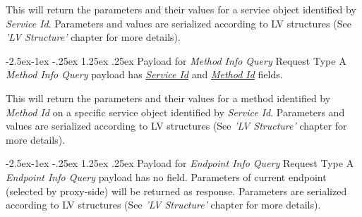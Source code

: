 \documentclass[10pt,a4paper]{article}
\makeatletter
\renewcommand\paragraph{\@startsection{paragraph}{4}{\z@}%
            {-2.5ex\@plus -1ex \@minus -.25ex}%
            {1.25ex \@plus .25ex}%
            {\normalfont\normalsize\bfseries}}
\makeatother
\begin{document}
This will return the parameters and their values for a service object identified by \textit{Service Id}. Parameters and values are serialized according to LV structures (See \textit{'LV Structure'} chapter for more details).

\paragraph{Payload for \textit{Method Info Query} Request Type} 
A \textit{Method Info Query} payload has \underline{\textit{Service Id}} and \underline{\textit{Method Id}} fields.

\begin{flushleft}
\end{flushleft}

This will return the parameters and their values for a method identified by \textit{Method Id} on a specific service object identified by \textit{Service Id}. Parameters and values are serialized according to LV structures (See \textit{'LV Structure'} chapter for more details).

\paragraph{Payload for \textit{Endpoint Info Query} Request Type} 
A \textit{Endpoint Info Query} payload has no field. Parameters of current endpoint (selected by proxy-side) will be returned as response. Parameters are serialized according to LV structures (See \textit{'LV Structure'} chapter for more details).
\end{document}
